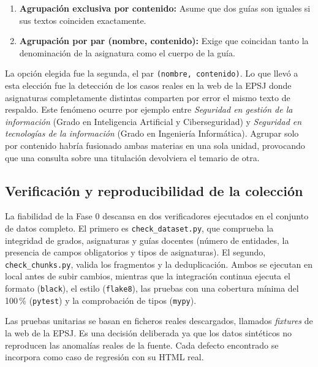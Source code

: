\begin{enumerate}
  \item \textbf{Agrupación exclusiva por contenido:} Asume que dos guías son iguales si sus textos coinciden exactamente.
  \item \textbf{Agrupación por par (nombre, contenido):} Exige que coincidan tanto la denominación de la asignatura como el cuerpo de la guía.
\end{enumerate}

La opción elegida fue la segunda, el par \texttt{(nombre, contenido)}. Lo que llevó a esta elección fue la detección de los casos reales en la web de la EPSJ donde asignaturas completamente distintas comparten por error el mismo texto de respaldo. Este fenómeno ocurre por ejemplo entre \textit{Seguridad en gestión de la información} (Grado en Inteligencia Artificial y Ciberseguridad) y \textit{Seguridad en tecnologías de la información} (Grado en Ingeniería Informática). Agrupar solo por contenido habría fusionado ambas materias en una sola unidad, provocando que una consulta sobre una titulación devolviera el temario de otra.



\subsection[Verificación y reproducibilidad de la colección]{Verificación y reproducibilidad de la colección}
\label{secc:verificacion_fase0}

La fiabilidad de la Fase 0 descansa en dos verificadores ejecutados en el conjunto de datos completo. El primero es \texttt{check\_dataset.py}, que comprueba la integridad de grados, asignaturas y guías docentes (número de entidades, la presencia de campos obligatorios y tipos de asignaturas). El segundo, \texttt{check\_chunks.py}, valida los fragmentos y la deduplicación. Ambos se ejecutan en local antes de subir cambios, mientras que la integración continua ejecuta el formato (\texttt{black}), el estilo (\texttt{flake8}), las pruebas con una cobertura mínima del 100\,\% (\texttt{pytest}) y la comprobación de tipos (\texttt{mypy}).

Las pruebas unitarias se basan en ficheros reales descargados, llamados \textit{fixtures} de la web de la EPSJ. Es una decisión deliberada ya que los datos sintéticos no reproducen las anomalías reales de la fuente. Cada defecto encontrado se incorpora como caso de regresión con su HTML real.

